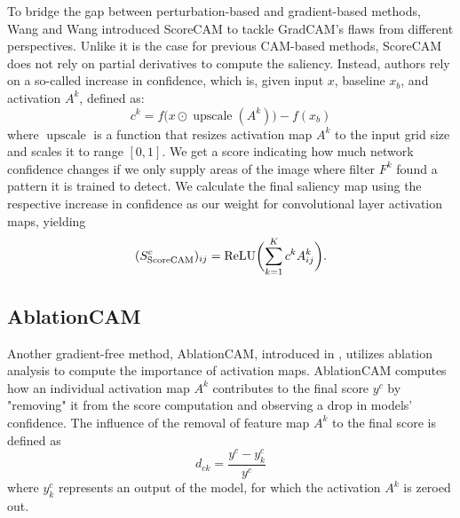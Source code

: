 To bridge the gap between perturbation-based and gradient-based methods, Wang and Wang \cite{score-cam} introduced ScoreCAM to tackle GradCAM's flaws from different perspectives.
Unlike it is the case for previous CAM-based methods, ScoreCAM does not rely on partial derivatives to compute the saliency.
Instead, authors rely on a so-called increase in confidence, which is, given input $x$, baseline $x_b$, and activation $A^k$, defined as:
\begin{equation}
    c^k = f\bigl(x \odot \operatorname{upscale}(A^k)\bigr) - f(x_b)
\end{equation}
where $\operatorname{upscale}$ is a function that resizes activation map $A^k$ to the input grid size and scales it to range $[0, 1]$.
We get a score indicating how much network confidence changes if we only supply areas of the image where filter $F^k$ found a pattern it is trained to detect.
We calculate the final saliency map using the respective increase in confidence as our weight for convolutional layer activation maps, yielding
\begin{equation}
    (S^c_{\text{ScoreCAM}})_{ij} = \operatorname{ReLU}\biggl(\sum_{k=1}^K c^k A^k_{ij}\biggr).
\end{equation}


\subsection{AblationCAM}

Another gradient-free method, AblationCAM, introduced in \cite{ablation-cam}, utilizes ablation analysis to compute the importance of activation maps.
AblationCAM computes how an individual activation map $A^k$ contributes to the final score $y^c$ by "removing" it from the score computation and observing a drop in models' confidence.
The influence of the removal of feature map $A^k$ to the final score is defined as
\begin{equation}\label{eq:ablation-cam-importance-weight}
    d_{ck} = \frac{y^c - y^c_k}{y^c}
\end{equation}
where $y^c_k$ represents an output of the model, for which the activation $A^k$ is zeroed out.

